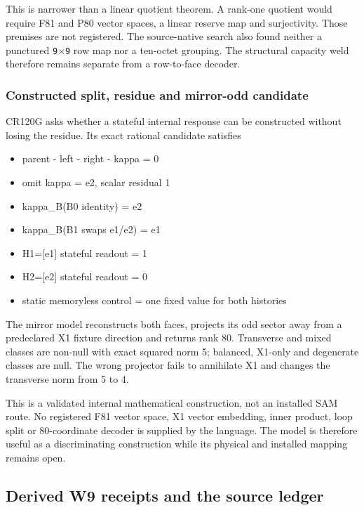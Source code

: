 This is narrower than a linear quotient theorem. A rank-one quotient
would require F81 and P80 vector spaces, a linear reserve map and
surjectivity. Those premises are not registered. The source-native
search also found neither a punctured \texttt{9\ensuremath{\times}9} row map nor a
ten-octet grouping. The structural capacity weld therefore remains
separate from a row-to-face decoder.

\subsubsection{Constructed split, residue and mirror-odd
candidate}\label{viii-ch05-constructed-split-residue-and-mirror-odd-candidate}

CR120G asks whether a stateful internal response can be constructed
without losing the residue. Its exact rational candidate satisfies

\begin{itemize}
\tightlist
\item
  parent - left - right - kappa = 0
\item
  omit kappa = e2, scalar residual 1
\item
  kappa\_B(B0 identity) = e2
\item
  kappa\_B(B1 swaps e1/e2) = e1
\item
  H1={[}e1{]} stateful readout = 1
\item
  H2={[}e2{]} stateful readout = 0
\item
  static memoryless control = one fixed value for both histories
\end{itemize}

The mirror model reconstructs both faces, projects its odd sector away
from a predeclared X1 fixture direction and returns rank 80. Transverse
and mixed classes are non-null with exact squared norm 5; balanced,
X1-only and degenerate classes are null. The wrong projector fails to
annihilate X1 and changes the transverse norm from 5 to 4.

This is a validated internal mathematical construction, not an installed
SAM route. No registered F81 vector space, X1 vector embedding, inner
product, loop split or 80-coordinate decoder is supplied by the
language. The model is therefore useful as a discriminating construction
while its physical and installed mapping remains open.

\subsection{Derived W9 receipts and the source
ledger}\label{viii-ch05-derived-w9-receipts-and-the-source-ledger}

